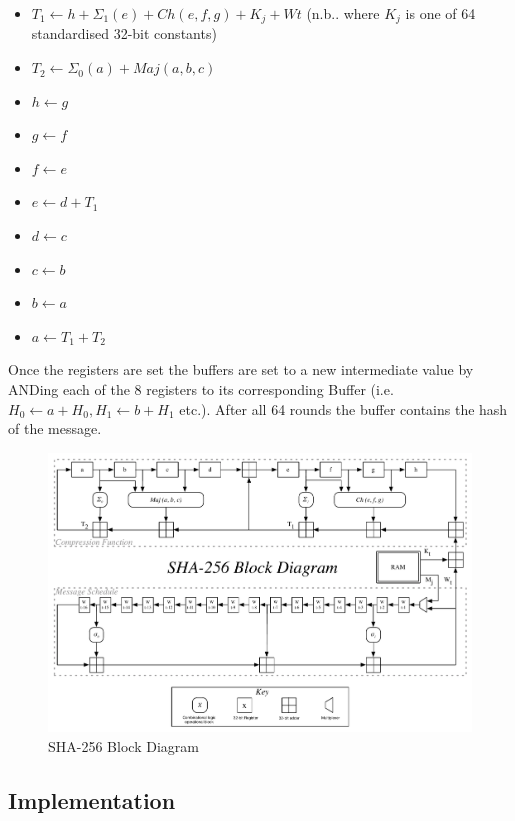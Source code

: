 \begin{itemize}
	\item $T_{1} \leftarrow h + \Sigma_{1}(e) + Ch(e,f,g) + K_{j}  + W{t}$ (n.b.. where $K_{j}$ is one of 64 standardised 32-bit constants)
	
	\item $T_{2} \leftarrow \Sigma_{0}(a) + Maj(a,b,c)$
	\item $h     \leftarrow g$
	\item $g     \leftarrow f$
	\item $f     \leftarrow e$
	\item $e     \leftarrow d + T_{1}$
	\item $d     \leftarrow c$
	\item $c     \leftarrow b$
	\item $b     \leftarrow a$
	\item $a     \leftarrow T_{1} + T_{2}$
\end{itemize}

Once the registers are set the buffers are set to a new intermediate value by
ANDing each of the 8 registers to its corresponding Buffer
(i.e. $H_{0} \leftarrow a + H_{0}, H_{1} \leftarrow b + H_{1}$ etc.).
After all 64 rounds the buffer contains the hash of the message.

\begin{figure}
  \centering
  \includegraphics[angle=270, scale=0.7]{images/sha256}
  \caption{SHA-256 Block Diagram}
\end{figure}

\subsection{Implementation}

